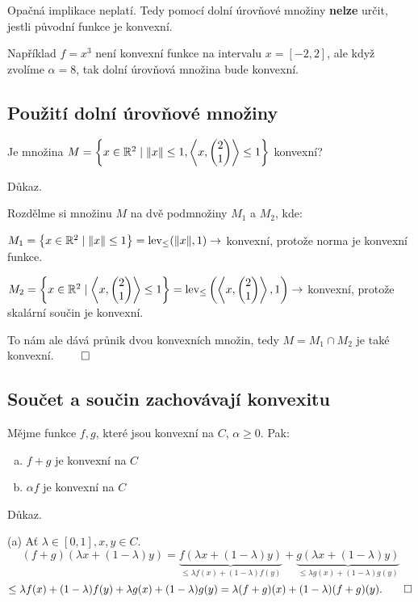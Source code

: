 Opačná implikace neplatí. Tedy pomocí dolní úrovňové množiny \textbf{nelze} určit, jestli původní funkce je konvexní.

Například $f = x^3$ není konvexní funkce na intervalu $x = [-2, 2]$, ale když zvolíme $\alpha = 8$, tak dolní úrovňová
množina bude konvexní. %

\subsection{Použití dolní úrovňové množiny}
Je množina $M = \left\lbrace x \in \mathbb{R}^2 \mid \| x\| \leq 1, \left\langle x,
\begin{pmatrix}
    2 \\
    1
\end{pmatrix}
\right\rangle \leq 1 \right\rbrace$ konvexní?

Důkaz.

Rozdělme si množinu $M$ na dvě podmnožiny $M_1$ a $M_2$, kde:

$M_1 = \left\lbrace x \in \mathbb{R}^2 \mid \| x\| \leq 1 \right\rbrace = \operatorname*{lev}_{\leq} (\| x\|, 1) \rightarrow$ konvexní, protože norma je konvexní
funkce.

$M_2 = \left\lbrace x \in \mathbb{R}^2 \mid \left\langle x,
\begin{pmatrix}
    2 \\
    1
\end{pmatrix}
\right\rangle \leq 1 \right\rbrace = \operatorname*{lev}_{\leq} \left(\left\langle x,
\begin{pmatrix}
    2 \\
    1
\end{pmatrix}
\right\rangle, 1\right) \rightarrow$ konvexní, protože skalární součin je konvexní.

To nám ale dává průnik dvou konvexních množin, tedy $M = M_1 \cap M_2$ je také konvexní. $\qed$

\newpage
\subsection{Součet a součin zachovávají konvexitu}\label{ssKonv}
Mějme funkce $f, g$, které jsou konvexní na $C$, $\alpha \geq 0$. Pak:
\begin{enumerate}[(a)]
    \item $f+g$ je konvexní na $C$
    \item $\alpha f$ je konvexní na $C$
\end{enumerate}
Důkaz.

(a) Ať $\lambda \in [0,1], x, y \in C$.
\[
    (f+g)(\lambda x + (1-\lambda)y) = \underbrace{f(\lambda x + (1-\lambda)y)}_{\leq \lambda f(x) + (1-\lambda)f(y)} +
    \underbrace{g(\lambda x + (1-\lambda)y)}_{\leq \lambda g(x) + (1-\lambda)g(y)}
\]
\[
    \leq \lambda f(x) + (1-\lambda)f(y) + \lambda g(x) + (1-\lambda)g(y) = \lambda (f+g)(x) + (1-\lambda)(f+g)(y). \qed
\]

